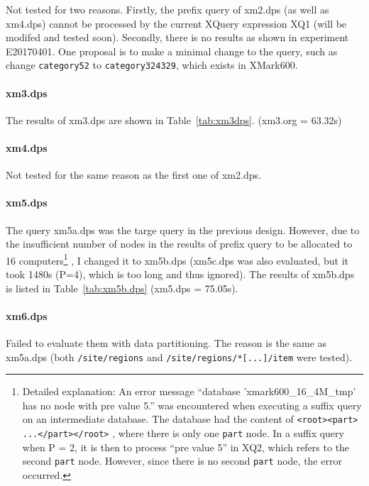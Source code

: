 Not tested for two reasons. Firstly, the prefix query of xm2.dps (as well
as xm4.dps) cannot be processed by the current XQuery expression XQ1
(will be modifed and tested soon). Secondly, there is no results as 
shown in experiment E20170401. One proposal is to  make a minimal 
change to the query, such as change \texttt{category52} to 
 \texttt{category324329}, which exists in XMark600.




\paragraph{xm3.dps}

The results of xm3.dps are shown in Table~\ref{tab:xm3dps}.
(xm3.org = 63.32s) 


\paragraph{xm4.dps}
Not tested for the same reason as the first one of xm2.dps.

\paragraph{xm5.dps}

The query xm5a.dps was the targe query in the previous design. 
However, due to the insufficient number of nodes in the results of prefix 
query to be allocated to 16 
computers\footnote{
Detailed explanation: An error message 
``database 'xmark600\_16\_4M\_tmp' has no node with pre value 5.'' was
encountered when executing a suffix query on an intermediate database.
The database had the content of  \texttt{<root><part> ...</part></root>} , 
where there is only one \texttt{part} node. 
In a suffix query when P = 2, it is then to process ``pre value 5'' in XQ2, 
which refers to the second \texttt{part} node. However, since there is 
no second \texttt{part} node, the error occurred.
}
, I changed it to xm5b.dps (xm5c.dps was also evaluated, but 
it took 1480s (P=4), which is too long and thus ignored). 
The results of xm5b.dps is listed in Table~\ref{tab:xm5b.dps}
(xm5.dps = 75.05s). 


\paragraph{xm6.dps}

Failed to evaluate them with data partitioning. The reason is 
the same as xm5a.dps (both \texttt{/site/regions} and 
\texttt{/site/regions/*[...]/item} were tested).


